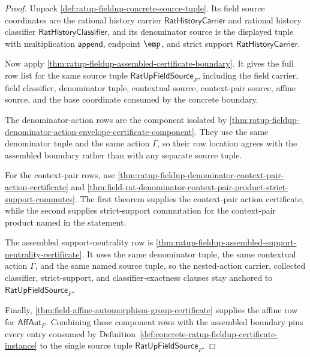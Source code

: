 \begin{proof}
Unpack \autoref{def:ratup-fieldup-concrete-source-tuple}. Its field source
coordinates are the rational history carrier
$\mathsf{RatHistoryCarrier}$ and rational history classifier
$\mathsf{RatHistoryClassifier}$, and its denominator source is the displayed
tuple with multiplication $\mathsf{append}$, endpoint $\emp$, and strict support
$\mathsf{RatHistoryCarrier}$.

Now apply \autoref{thm:ratup-fieldup-assembled-certificate-boundary}. It gives
the full row list for the same source tuple
$\mathsf{RatUpFieldSource}_F$, including the field carrier, field classifier,
denominator tuple, contextual source, context-pair source, affine source, and
the base coordinate consumed by the concrete boundary.

The denominator-action rows are the component isolated by
\autoref{thm:ratup-fieldup-denominator-action-envelope-certificate-component}.
They use the same denominator tuple and the same action $\Gamma$, so their row
location agrees with the assembled boundary rather than with any separate
source tuple.

For the context-pair rows, use
\autoref{thm:ratup-fieldup-denominator-context-pair-action-certificate} and
\autoref{thm:field-rat-denominator-context-pair-product-strict-support-commutes}.
The first theorem supplies the context-pair action certificate, while the second
supplies strict-support commutation for the context-pair product named in the
statement.

The assembled support-neutrality row is
\autoref{thm:ratup-fieldup-assembled-support-neutrality-certificate}. It uses
the same denominator tuple, the same contextual action $\Gamma$, and the same
named source tuple, so the nested-action carrier, collected classifier,
strict-support, and classifier-exactness clauses stay anchored to
$\mathsf{RatUpFieldSource}_F$.

Finally, \autoref{thm:field-affine-automorphism-group-certificate} supplies the
affine row for $\mathsf{AffAut}_F$. Combining these component rows with the
assembled boundary pins every entry consumed by
Definition~\ref{def:concrete-ratup-fieldup-certificate-instance} to the single
source tuple $\mathsf{RatUpFieldSource}_F$.
\end{proof}

